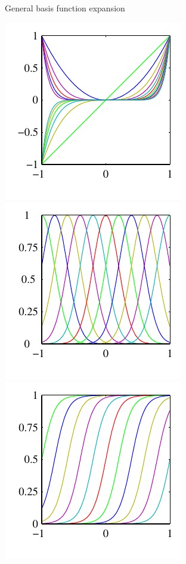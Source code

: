 \documentclass[ignorenonframetext,aspectratio=169]{beamer}
\begin{document}
\begin{frame}{General basis function expansion}
\begin{center}\includegraphics[height=0.38\textheight]{./figs/Figure3_1a} \includegraphics[height=0.38\textheight]{./figs/Figure3_1b} \includegraphics[height=0.38\textheight]{./figs/Figure3_1c} \end{center}

\end{frame}
\end{document}
